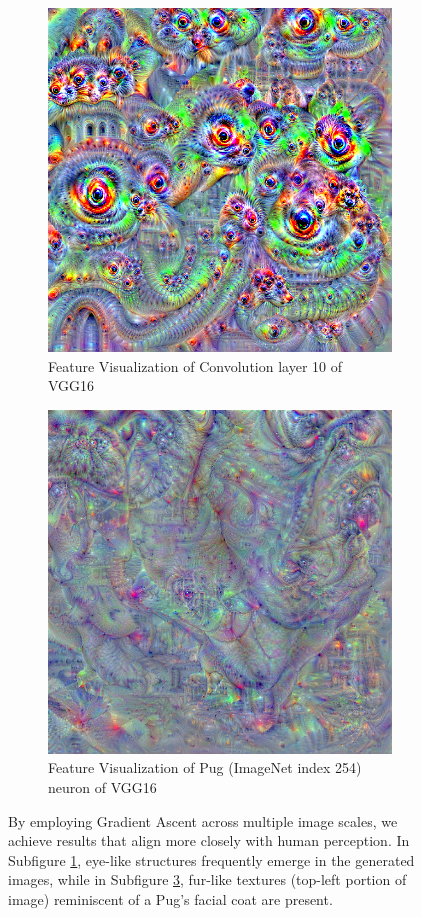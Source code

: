 \begin{figure}
    \captionsetup{justification=centering}

    \begin{subfigure}[t]{0.45\textwidth}
        \captionsetup{justification=centering}
        \centering
        \includegraphics[width=.7\linewidth]{figuras/feat_vis/random_image_dream_pyramid.png}
        \caption{Feature Visualization of Convolution layer 10 of VGG16}
        \label{fig:feat_conv_L22_pyramid}
    \end{subfigure}
    \hfill
    \begin{subfigure}[t]{0.45\textwidth}
        \captionsetup{justification=centering}
        \centering
        \includegraphics[width=.7\linewidth]{figuras/feat_vis/random_image_dream_pyramid_class_254.png}
        \caption{Feature Visualization of Pug (ImageNet index 254) neuron of VGG16}
        \label{fig:feat_conv_I254_pyramid}
    \end{subfigure}

    \caption{By employing Gradient Ascent across multiple image scales, we achieve results that align more closely with human perception. In Subfigure \ref{fig:feat_conv_L22_pyramid}, eye-like structures frequently emerge in the generated images, while in Subfigure \ref{fig:feat_conv_I254_pyramid}, fur-like textures (top-left portion of image) reminiscent of a Pug's facial coat are present.}
\end{figure}

